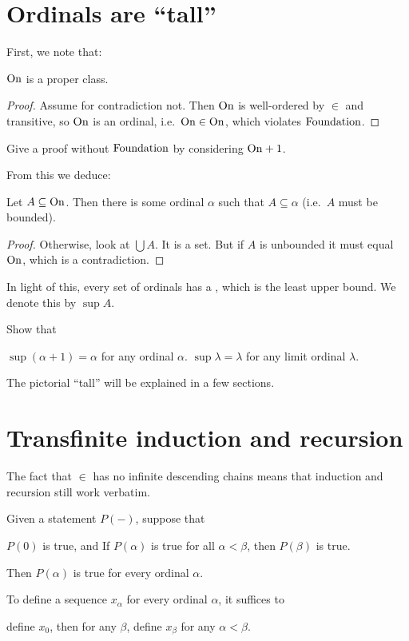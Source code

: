 \section{Ordinals are ``tall''}
First, we note that:
\begin{theorem}
	$\mathrm{On}$ is a proper class.
\end{theorem}
\begin{proof}
	Assume for contradiction not.
	Then $\mathrm{On}$ is well-ordered by $\in$ and transitive, so $\mathrm{On}$ is an ordinal,
	i.e.\ $\mathrm{On} \in \mathrm{On}$, which violates $\mathrm{Foundation}$.
\end{proof}
\begin{exercise}
	[Unimportant] Give a proof without $\mathrm{Foundation}$ by considering $\mathrm{On}+1$.
\end{exercise}

From this we deduce:
\begin{theorem}
	Let $A \subseteq \mathrm{On}$.
	Then there is some ordinal $\alpha$ such that $A \subseteq \alpha$
	(i.e.\ $A$ must be bounded).
\end{theorem}
\begin{proof}
	Otherwise, look at $\bigcup A$.
	It is a set.
	But if $A$ is unbounded it must equal $\mathrm{On}$,
	which is a contradiction.
\end{proof}
In light of this, every set of ordinals has a ,
which is the least upper bound. We denote this by $\sup A$.

\begin{ques}
	Show that
	\begin{enumerate}[(a)]
		\ii $\sup (\alpha+1) = \alpha$ for any ordinal $\alpha$.
		\ii $\sup \lambda = \lambda$ for any limit ordinal $\lambda$.
	\end{enumerate}
\end{ques}

The pictorial ``tall'' will be explained in a few sections.

\section{Transfinite induction and recursion}
The fact that $\in$ has no infinite descending chains means that induction and recursion still work verbatim.
\begin{theorem}
	Given a statement $P(-)$, suppose that
	\begin{itemize}
		\ii $P(0)$ is true, and
		\ii If $P(\alpha)$ is true for all $\alpha < \beta$, then $P(\beta)$ is true.
	\end{itemize}
	Then $P(\alpha)$ is true for every ordinal $\alpha$.
\end{theorem}
\begin{theorem}
	To define a sequence $x_\alpha$ for every ordinal $\alpha$,
	it suffices to
	\begin{itemize}
		\ii define $x_0$, then
		\ii for any $\beta$, define $x_\beta$ for any $\alpha < \beta$.
	\end{itemize}
\end{theorem}

